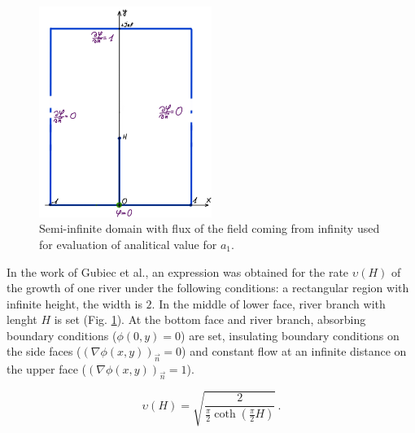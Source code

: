 \documentclass[]{pracamgr}
\begin{document}
    \begin{figure}[H]
      \centering
      \includegraphics[width=0.5\textwidth]{figs/test_function_boundary.png}
      \caption{Semi-infinite domain with flux of the field coming from infinity used for evaluation of analitical value for $a_1$.}
      \label{test_boundary}
    \end{figure}

    In the work of Gubiec et al.\cite{gubiec2008fingered}, an expression was obtained for the rate $\upsilon(H)$ of the growth of one river under the following conditions: a rectangular region with infinite height, the width is $2$. In the middle of lower face, river branch with lenght $H$ is set (Fig. \ref{test_boundary}). At the bottom face and river branch, absorbing boundary conditions ($\phi(0, y) = 0$) are set, insulating boundary conditions on the side faces ($(\nabla \phi(x, y))_{ \vec{n}} = 0$) and constant flow at an infinite distance on the upper face ($(\nabla \phi(x, y))_{\vec{n}} = 1$).

    \begin{equation}
      \label{velocity_analytical}
      \upsilon(H) = \sqrt{\frac{2}{\frac{\pi}{2}\coth(\frac{\pi}{2}H)}} \,.
    \end{equation}
    
\end{document}
